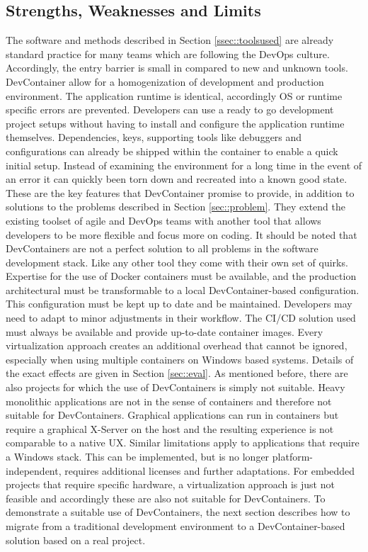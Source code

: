 \documentclass[12pt, a4paper]{article}
\begin{document}
    \subsection{Strengths, Weaknesses and Limits}\label{ssec::limits}
    The software and methods described in Section \ref{ssec::toolsused} are already standard practice for many teams which are following the DevOps culture. Accordingly, the entry barrier is small in compared to new and unknown tools. DevContainer allow for a homogenization of development and production environment. The application runtime is identical, accordingly \ac{OS} or runtime specific errors are prevented. Developers can use a ready to go development project setups without having to install and configure the application runtime themselves. Dependencies, keys, supporting tools like debuggers and configurations can already be shipped within the container to enable a quick initial setup. Instead of examining the environment for a long time in the event of an error it can quickly been torn down and recreated into a known good state. These are the key features that DevContainer promise to provide, in addition to solutions to the problems described in Section \ref{sec::problem}. They extend the existing toolset of agile and DevOps teams with another tool that allows developers to be more flexible and focus more on coding.\newline
    It should be noted that DevContainers are not a perfect solution to all problems in the software development stack. Like any other tool they come with their own set of quirks. Expertise for the use of Docker containers must be available, and the production architectural must be transformable to a local DevContainer-based configuration. This configuration must be kept up to date and be maintained. Developers may need to adapt to minor adjustments in their workflow. The CI/CD solution used must always be available and provide up-to-date container images. Every virtualization approach creates an additional overhead that cannot be ignored, especially when using multiple containers on Windows based systems. Details of the exact effects are given in Section \ref{sec::eval}.\newline
    As mentioned before, there are also projects for which the use of DevContainers is simply not suitable. Heavy monolithic applications are not in the sense of containers and therefore not suitable for DevContainers. Graphical applications can run in containers but require a graphical X-Server on the host and the resulting experience is not comparable to a native \ac{UX}. Similar limitations apply to applications that require a Windows stack. This can be implemented, but is no longer platform-independent, requires additional licenses and further adaptations. For embedded projects that require specific hardware, a virtualization approach is just not feasible and accordingly these are also not suitable for DevContainers.\newline
    To demonstrate a suitable use of DevContainers, the next section describes how to migrate from a traditional development environment to a DevContainer-based solution based on a real project.
\end{document}
